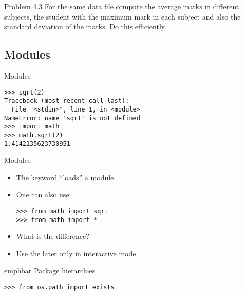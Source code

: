 \documentclass[14pt,compress]{beamer}
\newcommand{\emphbar}[1]
{\begin{beamercolorbox}[rounded=true]{emphbar} 
      {#1}
 \end{beamercolorbox}
}
\newcounter{time}
\newcommand{\inctime}[1]{\addtocounter{time}{#1}{\tiny \thetime\ m}}
\newcommand{\kwrd}[1]{ \texttt{\textbf{\color{blue}{#1}}}  }
\begin{document}
\begin{frame}{Problem 4.3}
    For the same data file compute the average marks in different
    subjects, the student with the maximum mark in each subject and also
    the standard deviation of the marks.  Do this efficiently.

    \inctime{20}
\end{frame}


\subsection{Modules}

\begin{frame}[fragile]
    {Modules}
\begin{lstlisting}
>>> sqrt(2)
Traceback (most recent call last):
  File "<stdin>", line 1, in <module>
NameError: name 'sqrt' is not defined
>>> import math        
>>> math.sqrt(2)
1.4142135623730951
\end{lstlisting}
\end{frame}

\begin{frame}[fragile]
    {Modules}
  \begin{itemize}
    \item The \kwrd{import} keyword ``loads'' a module
    \item One can also use:
      \begin{lstlisting}
>>> from math import sqrt
>>> from math import *
      \end{lstlisting}    
    \item What is the difference?
    \item \alert{Use the later only in interactive mode}
    \end{itemize}
  \emphbar{Package hierarchies}
      \begin{lstlisting}
>>> from os.path import exists
      \end{lstlisting}
\end{frame}
\end{document}
